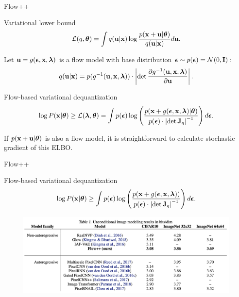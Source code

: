 \begin{frame}{Flow++}
	\vspace{-0.3cm}
	\begin{block}{Variational lower bound}
		\vspace{-0.3cm}
		\[
		\mathcal{L}(q, \boldsymbol{\theta}) = \int q(\mathbf{u} | \mathbf{x}) \log \frac{p(\mathbf{x} + \mathbf{u} | \boldsymbol{\theta})}{q(\mathbf{u} | \mathbf{x})} d \mathbf{u}.
		\]
		\vspace{-0.3cm}
	\end{block}
	Let $\mathbf{u} = g(\boldsymbol{\epsilon}, \mathbf{x}, \boldsymbol{\lambda})$ is a flow model with base distribution $\boldsymbol{\epsilon} \sim p(\boldsymbol{\epsilon}) = \mathcal{N}(0, \mathbf{I})$:
	\vspace{-0.3cm}
	\[
	q(\mathbf{u} | \mathbf{x}) = p(g^{-1}(\mathbf{u}, \mathbf{x}, \boldsymbol{\lambda})) \cdot \left| \det \frac{\partial g^{-1}(\mathbf{u}, \mathbf{x}, \boldsymbol{\lambda})}{\partial \mathbf{u}}\right|.
	\]
	\vspace{-0.7cm}
	\begin{block}{Flow-based variational dequantization}
		\vspace{-0.8cm}
		\[
		\log P(\mathbf{x} | \boldsymbol{\theta}) \geq \mathcal{L}(\boldsymbol{\lambda}, \boldsymbol{\theta}) = \int p(\boldsymbol{\epsilon}) \log \left( \frac{p(\mathbf{x} + g(\boldsymbol{\epsilon}, \mathbf{x}, \boldsymbol{\lambda}) | \boldsymbol{\theta})}{p(\boldsymbol{\epsilon}) \cdot \left| \det \mathbf{J}_g\right|^{-1}} \right) d\boldsymbol{\epsilon}.
		\]
		\vspace{-0.3cm}
	\end{block}
	If $p(\mathbf{x} + \mathbf{u} | \boldsymbol{\theta})$ is also a flow model, it is straightforward to calculate stochastic gradient of this ELBO.
\end{frame}
\begin{frame}{Flow++}
	\begin{block}{Flow-based variational dequantization}
		\vspace{-0.3cm}
		\[
		\log P(\mathbf{x} | \boldsymbol{\theta}) \geq \int p(\boldsymbol{\epsilon})\log \left( \frac{p(\mathbf{x} + g(\boldsymbol{\epsilon}, \mathbf{x}, \boldsymbol{\lambda}))}{p(\boldsymbol{\epsilon}) \cdot \left| \det \mathbf{J}_g\right|^{-1}} \right) d\boldsymbol{\epsilon}.
		\]
	\end{block}
	\begin{figure}
		\centering
		\includegraphics[width=\linewidth]{figs/flow++1.png}
	\end{figure}
	\vspace{-0.1cm}
\end{frame}
